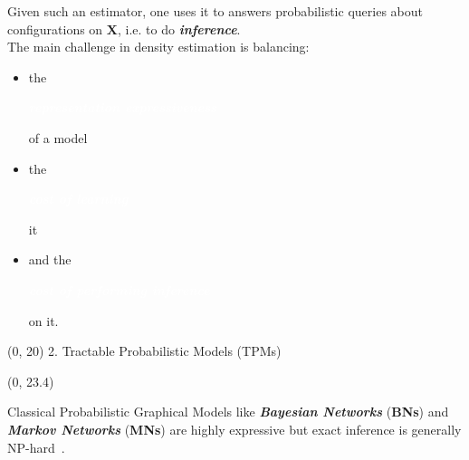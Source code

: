 \documentclass[final]{beamer}
\newcommand{\highlighttext}[2][yellow]{{\colorbox{#1}{\strut\textcolor{white}{#2}}}}
\begin{document}
\begin{frame}{}
\begin{textblock}{17.5}
    Given such an estimator, one uses it to answers
    probabilistic queries about configurations on $\mathbf{X}$,
    i.e. to do \emph{\textbf{inference}}.\\[20pt]

    The main challenge in density estimation is balancing:
    \begin{itemize}
    \item the \highlighttext[lacamlightlilac]{\textbf{\emph{representation expressiveness}}} of a model
    \item the \highlighttext[lacamlightlilac]{\textbf{\emph{cost of learning}}} it
      \item and the \highlighttext[lacamlightlilac]{\textbf{\emph{cost of performing inference}}} on it.
    \end{itemize}
    

    
    

  \end{textblock}

  \begin{textblock}{17.5}(0, 20)
    2. Tractable Probabilistic Models (TPMs)
  \end{textblock}
  
  \begin{textblock}{17.5}(0, 23.4)
    \small

    Classical Probabilistic Graphical Models like \emph{\textbf{Bayesian Networks}}
    (\textbf{BNs}) and \emph{\textbf{Markov Networks}} (\textbf{MNs}) are highly expressive but
    exact inference is generally NP-hard~\cite{Roth1996}.
    \vspace{20pt}


\end{textblock}
\end{frame}
\end{document}
